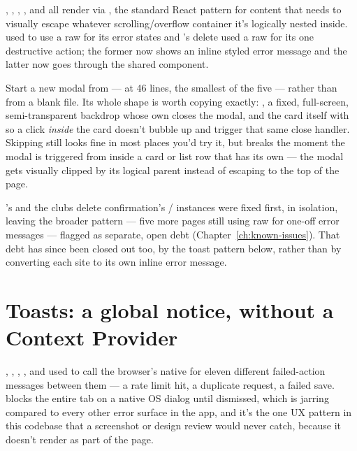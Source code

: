 , , , , and  all render via , the standard React pattern for content that needs to visually escape whatever scrolling/overflow container it's logically nested inside.  used to use a raw  for its error states and 's delete used a raw  for its one destructive action; the former now shows an inline styled error message and the latter now goes through the shared  component.

\begin{olkhowto}
Start a new modal from  — at 46 lines, the smallest of the five — rather than from a blank file. Its whole shape is worth copying exactly: , a fixed, full-screen, semi-transparent backdrop  whose own  closes the modal, and the card itself with  so a click \emph{inside} the card doesn't bubble up and trigger that same close handler. Skipping  still looks fine in most places you'd try it, but breaks the moment the modal is triggered from inside a card or list row that has its own  — the modal gets visually clipped by its logical parent instead of escaping to the top of the page.
\end{olkhowto}

\begin{olknote}
's and the clubs delete confirmation's / instances were fixed first, in isolation, leaving the broader pattern — five more pages still using raw  for one-off error messages — flagged as separate, open debt (Chapter~\ref{ch:known-issues}). That debt has since been closed out too, by the toast pattern below, rather than by converting each site to its own inline error message.
\end{olknote}

\section{Toasts: a global notice, without a Context Provider}

, , , , and  used to call the browser's native  for eleven different failed-action messages between them — a rate limit hit, a duplicate request, a failed save.  blocks the entire tab on a native OS dialog until dismissed, which is jarring compared to every other error surface in the app, and it's the one UX pattern in this codebase that a screenshot or design review would never catch, because it doesn't render as part of the page.

